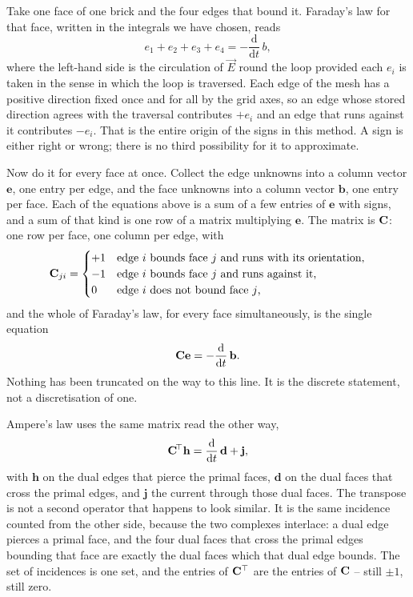 Take one face of one brick and the four edges that bound it. Faraday's law for that face, written in the
integrals we have chosen, reads
\begin{equation}
  e_1 + e_2 + e_3 + e_4 = -\frac{\mathrm{d}}{\mathrm{d}t} \, b ,
  \label{eq:hiw-faraday-face}
\end{equation}
where the left-hand side is the circulation of $\vec E$ round the loop provided each $e_i$ is taken in the sense
in which the loop is traversed. Each edge of the mesh has a positive direction fixed once and for all by the
grid axes, so an edge whose stored direction agrees with the traversal contributes $+e_i$ and an edge that runs
against it contributes $-e_i$. That is the entire origin of the signs in this method. A sign is either right or
wrong; there is no third possibility for it to approximate.

Now do it for every face at once. Collect the edge unknowns into a column vector $\mathbf{e}$, one entry per
edge, and the face unknowns into a column vector $\mathbf{b}$, one entry per face. Each of the equations above
is a sum of a few entries of $\mathbf{e}$ with signs, and a sum of that kind is one row of a matrix multiplying
$\mathbf{e}$. The matrix is $\mathbf{C}$: one row per face, one column per edge, with
\begin{equation}
  \mathbf{C}_{ji} =
  \begin{cases}
    +1 & \text{edge $i$ bounds face $j$ and runs with its orientation,}\\
    -1 & \text{edge $i$ bounds face $j$ and runs against it,}\\
     0 & \text{edge $i$ does not bound face $j$,}
  \end{cases}
  \label{eq:hiw-C}
\end{equation}
and the whole of Faraday's law, for every face simultaneously, is the single equation
\begin{equation}
  \mathbf{C} \mathbf{e} = -\frac{\mathrm{d}}{\mathrm{d}t}\,\mathbf{b} .
  \label{eq:hiw-faraday}
\end{equation}
Nothing has been truncated on the way to this line. It is the discrete statement, not a discretisation of one.

Ampere's law uses the same matrix read the other way,
\begin{equation}
  \mathbf{C}^{\!\top} \mathbf{h} = \frac{\mathrm{d}}{\mathrm{d}t}\,\mathbf{d} + \mathbf{j} ,
  \label{eq:hiw-ampere}
\end{equation}
with $\mathbf{h}$ on the dual edges that pierce the primal faces, $\mathbf{d}$ on the dual faces that cross the
primal edges, and $\mathbf{j}$ the current through those dual faces. The transpose is not a second operator that
happens to look similar. It is the same incidence counted from the other side, because the two complexes
interlace: a dual edge pierces a primal face, and the four dual faces that cross the primal edges bounding that
face are exactly the dual faces which that dual edge bounds. The set of incidences is one set, and the entries
of $\mathbf{C}^{\top}$ are the entries of $\mathbf{C}$ -- still $\pm 1$, still zero.

